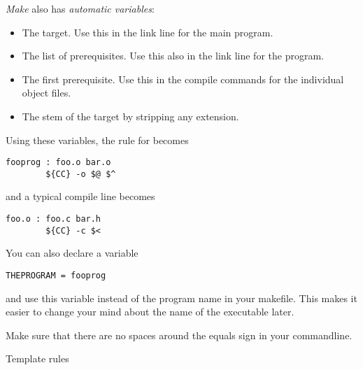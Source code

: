 \emph{Make} also has \emph{automatic variables}:
\begin{itemize}
\item [\n{\$@}] The target. Use this in the link line for the main
  program. %
\item [\n{\$\char`\^}] The list of prerequisites. Use this also in the link
  line for the program.
\item [\n{\$<}] The first prerequisite. Use this in the compile
  commands for the individual object files.
\item [\n{\$*}] The stem of the target by stripping any extension.
\end{itemize}
Using these variables, the rule for  becomes
\begin{verbatim}
fooprog : foo.o bar.o
        ${CC} -o $@ $^
\end{verbatim}
and a typical compile line becomes
\begin{verbatim}
foo.o : foo.c bar.h
        ${CC} -c $<
\end{verbatim}

You can also declare a variable
\begin{verbatim}
THEPROGRAM = fooprog
\end{verbatim}
and use this variable instead of the program name in your
makefile. This makes it easier to change your mind about the name of
the executable later. 

  {Make sure that there are no spaces
  around the equals sign in your commandline.}

 {Template rules}

